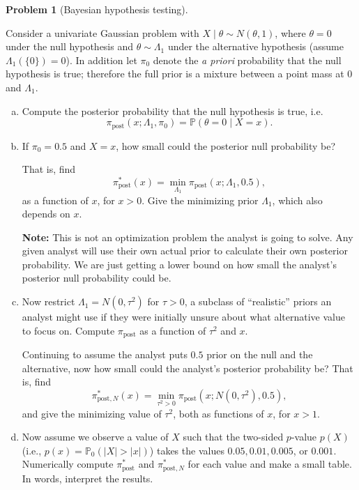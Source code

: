 \documentclass{article}
\newcommand{\PP}{\mathbb{P}}
\theoremstyle{definition}
\newtheorem{problem}{Problem}
\begin{document}
\begin{problem}[Bayesian hypothesis testing]
\label{prob:bayes-testing}

Consider a univariate Gaussian problem with $X\mid \theta \sim N(\theta, 1)$, where $\theta=0$ under the null hypothesis and $\theta\sim \Lambda_1$ under the alternative hypothesis (assume $\Lambda_1(\{0\})=0$). In addition let $\pi_0$ denote the {\em a priori} probability that the null hypothesis is true; therefore the full prior is a mixture between a point mass at 0 and $\Lambda_1$.

\begin{enumerate}[(a)]
\item Compute the posterior probability that the null hypothesis is true, i.e.
\[
\pi_{\text{post}}(x; \Lambda_1, \pi_0) = \PP(\theta = 0 \mid X=x).
\]



\item If $\pi_0=0.5$ and $X = x$, how small could the posterior null probability be?

That is, find
\[
\pi_{\text{post}}^*(x) = \min_{\Lambda_1} \pi_{\text{post}}(x; \Lambda_1, 0.5),
\]
as a function of $x$, for $x>0$. Give the minimizing prior $\Lambda_1$, which also depends on $x$.



{\bf Note:} This is not an optimization problem the analyst is going to solve. Any given analyst will use their own actual prior to calculate their own posterior probability. We are just getting a lower bound on how small the analyst's posterior null probability could be.

\item Now restrict $\Lambda_1 = N(0,\tau^2)$ for $\tau > 0$, a subclass of ``realistic'' priors an analyst might use if they were initially unsure about what alternative value to focus on. Compute $\pi_{\text{post}}$ as a function of $\tau^2$ and $x$.

Continuing to assume the analyst puts $0.5$ prior on the null and the alternative, now how small could the analyst's posterior probability be? That is, find
\[
\pi_{\text{post},N}^*(x) = \min_{\tau^2>0} \pi_{\text{post}}(x; N(0,\tau^2), 0.5),
\]
and give the minimizing value of $\tau^2$, both as functions of $x$, for $x > 1$.




\item Now assume we observe a value of $X$ such that the two-sided $p$-value $p(X)$ (i.e., $p(x) = \PP_0(|X|>|x|)$) takes the values $0.05, 0.01, 0.005$, or $0.001$. Numerically compute $\pi_{\text{post}}^*$ and $\pi_{\text{post},N}^*$ for each value and make a small table. In words, interpret the results.




\end{enumerate}
\end{problem}
\end{document}
